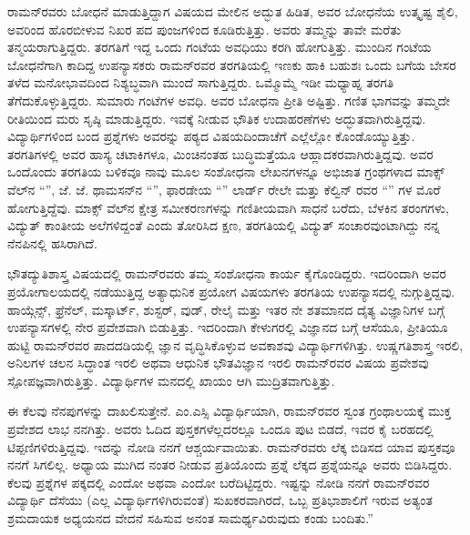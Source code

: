 ರಾಮನ್‍ರವರು ಬೋಧನೆ ಮಾಡುತ್ತಿದ್ದಾಗ ವಿಷಯದ ಮೇಲಿನ ಅದ್ಭುತ ಹಿಡಿತ, ಅವರ ಬೋಧನೆಯ ಉತ್ಕೃಷ್ಟ ಶೈಲಿ, ಅವರಿಂದ ಹೊರಬೀಳುವ ನಿಖರ ಪದ ಪುಂಜಗಳಿಂದ ಕೂಡಿರುತ್ತಿತ್ತು. ಅವರು ತಮ್ಮನ್ನು ತಾವೇ ಮರೆತು ತನ್ಮಯರಾಗುತ್ತಿದ್ದರು. ತರಗತಿಗೆ ಇದ್ದ ಒಂದು ಗಂಟೆಯ ಅವಧಿಯು ಕರಗಿ ಹೋಗುತ್ತಿತ್ತು. ಮುಂದಿನ ಗಂಟೆಯ ಬೋಧನೆಗಾಗಿ ಕಾದಿದ್ದ ಉಪನ್ಯಾಸಕರು ರಾಮನ್‍ರವರ ತರಗತಿಯಲ್ಲಿ ಇಣಕು ಹಾಕಿ ಬಹುಶಃ ಒಂದು ಬಗೆಯ ಬೇಸರ ತಳೆದ ಮನೋಭಾವದಿಂದ ನಿಶ್ಯಬ್ಧವಾಗಿ ಮುಂದೆ ಸಾಗುತ್ತಿದ್ದರು. ಒಮ್ಮೊಮ್ಮೆ ಇಡೀ ಮಧ್ಯಾಹ್ನ ತರಗತಿ ತೆಗೆದುಕೊಳ್ಳುತ್ತಿದ್ದರು. ಸುಮಾರು  ಗಂಟೆಗಳ ಅವಧಿ. ಅವರ ಬೋಧನಾ ಪ್ರೀತಿ ಅಷ್ಟಿತ್ತು. ಗಣಿತ ಭಾಗವನ್ನು ತಮ್ಮದೇ ರೀತಿಯಿಂದ ಮರು ಸೃಷ್ಠಿ ಮಾಡುತ್ತಿದ್ದರು. ಇವಕ್ಕೆ ನೀಡುವ ಭೌತಿಕ ಉದಾಹರಣೆಗಳು ಅದ್ಭುತವಾಗಿರುತ್ತಿದ್ದವು. ವಿದ್ಯಾರ್ಥಿಗಳಿಂದ ಬಂದ ಪ್ರಶ್ನೆಗಳು ಅವರನ್ನು ಪಠ್ಯದ ವಿಷಯದಿಂದಾಚೆಗೆ ಎಲ್ಲೆಲ್ಲೋ ಕೊಂಡೊಯ್ಯುತ್ತಿತ್ತು. ತರಗತಿಗಳಲ್ಲಿ ಅವರ ಹಾಸ್ಯ ಚಟಾಕಿಗಳೂ, ಮಿಂಚಿನಂತಹ ಬುದ್ಧಿಮತ್ತೆಯೂ ಆಹ್ಲಾದಕರವಾಗಿರುತ್ತಿದ್ದವು. ಅವರ ಒಂದೊಂದು ತರಗತಿಯ ಬಳಿಕವೂ ನಾವು ಮೂಲ ಸಂಶೋಧನಾ ಲೇಖನಗಳನ್ನೂ ಅಭಿಜಾತ ಗ್ರಂಥಗಳಾದ ಮಾಕ್ಸ್ ವೆಲ್‍ನ “”, ಜೆ. ಜೆ. ಥಾಮಸನ್‍ನ “”, ಫಾರಡೇಯ “” ಲಾರ್ಡ್ ರೇಲೇ ಮತ್ತು ಕೆಲ್ವಿನ್ ರವರ “” ಗಳ ಮೊರೆ ಹೋಗುತ್ತಿದ್ದೆವು. ಮಾಕ್ಸ್ ವೆಲ್‍ನ ಕ್ಷೇತ್ರ ಸಮೀಕರಣಗಳನ್ನು ಗಣಿತೀಯವಾಗಿ ಸಾಧನೆ ಬರೆದು, ಬೆಳಕಿನ ತರಂಗಗಳು, ವಿದ್ಯುತ್ ಕಾಂತೀಯ ಅಲೆಗಳಿದ್ದಂತೆ ಎಂದು ತೋರಿಸಿದ ಕ್ಷಣ, ತರಗತಿಯಲ್ಲಿ ವಿದ್ಯುತ್ ಸಂಚಾರವುಂಟಾಗಿದ್ದು ನನ್ನ ನೆನಪಿನಲ್ಲಿ ಹಸಿರಾಗಿದೆ.

ಭೌತದ್ಯುತಿಶಾಸ್ತ್ರ ವಿಷಯದಲ್ಲಿ ರಾಮನ್‍ರವರು ತಮ್ಮ ಸಂಶೋಧನಾ ಕಾರ್ಯ ಕೈಗೊಂಡಿದ್ದರು. ಇದರಿಂದಾಗಿ ಅವರ ಪ್ರಯೋಗಾಲಯದಲ್ಲಿ ನಡೆಯುತ್ತಿದ್ದ ಅತ್ಯಾಧುನಿಕ ಪ್ರಯೋಗ ವಿಷಯಗಳು ತರಗತಿಯ ಉಪನ್ಯಾಸದಲ್ಲಿ ನುಗ್ಗುತ್ತಿದ್ದವು. ಹಾಯ್ಗೆನ್ಸ್, ಫ್ರೆನೆಲ್, ಮಸ್ಕಾರ್ಟ್, ಶುಸ್ಟರ್, ವುಡ್, ರೇಲೈ ಮತ್ತು ಇತರ ನೇ ಶತಮಾನದ ದೈತ್ಯ ವಿಜ್ಞಾನಿಗಳ ಬಗ್ಗೆ ಉಪನ್ಯಾಸಗಳಲ್ಲಿ ನೇರ ಪ್ರವೇಶವಾಗಿ ಬಿಡುತ್ತಿತ್ತು. ಇದರಿಂದಾಗಿ ಕೇಳುಗರಲ್ಲಿ ವಿಜ್ಞಾನದ ಬಗ್ಗೆ ಆಸೆಯೂ, ಪ್ರೀತಿಯೂ ಹುಟ್ಟಿ ರಾಮನ್‍ರವರ ಪಾದದಡಿಯಲ್ಲಿ ಜ್ಞಾನ ವೃದ್ಧಿಸಿಕೊಳ್ಳುವ ಅವಕಾಶವು ವಿದ್ಯಾರ್ಥಿಗಳಿಗಿತ್ತು. ಉಷ್ಣಗತಿಶಾಸ್ತ್ರ ಇರಲಿ, ಅನಿಲಗಳ ಚಲನ ಸಿದ್ಧಾಂತ ಇರಲಿ ಅಥವಾ ಆಧುನಿಕ ಭೌತವಿಜ್ಞಾನ ಇರಲಿ ರಾಮನ್‍ರವರ ವಿಷಯ ಪ್ರವೇಶವು ಸ್ಪೋಪಜ್ಞವಾಗಿರುತ್ತಿತ್ತು. ವಿದ್ಯಾರ್ಥಿಗಳ ಮನದಲ್ಲಿ ಖಾಯಂ ಆಗಿ ಮುದ್ರಿತವಾಗುತ್ತಿತ್ತು.

ಈ ಕೆಲವು ನೆನಪುಗಳನ್ನು ದಾಖಲಿಸುತ್ತೇನೆ. ಎಂ.ಎಸ್ಸಿ ವಿದ್ಯಾರ್ಥಿಯಾಗಿ, ರಾಮನ್‍ರವರ ಸ್ವಂತ ಗ್ರಂಥಾಲಯಕ್ಕೆ ಮುಕ್ತ ಪ್ರವೇಶದ ಲಾಭ ನನಗಿತ್ತು. ಅವರು ಓದಿದ ಪುಸ್ತಕಗಳೆಲ್ಲದರಲ್ಲೂ ಒಂದೂ ಪುಟ ಬಿಡದೆ, ಇವರ ಕೈ ಬರಹದಲ್ಲಿ ಟಿಪ್ಪಣಿಗಳಿರುತ್ತಿದ್ದವು. ಇದನ್ನು ನೋಡಿ ನನಗೆ ಆಶ್ಚರ್ಯವಾಯಿತು. ರಾಮನ್‍ರವರು ಲೆಕ್ಕ ಬಿಡಿಸದ ಯಾವ ಪುಸ್ತಕವೂ ನನಗೆ ಸಿಗಲಿಲ್ಲ. ಅಧ್ಯಾಯ ಮುಗಿದ ನಂತರ ನೀಡುವ ಪ್ರತಿಯೊಂದು ಪ್ರಶ್ನೆ ಲೆಕ್ಕದ ಪ್ರಶ್ನೆಯನ್ನೂ ಅವರು ಬಿಡಿಸಿದ್ದರು. ಕೆಲವು ಪ್ರಶ್ನೆಗಳ ಪಕ್ಕದಲ್ಲಿ  ಎಂದೋ  ಅಥವಾ  ಎಂದೋ ಬರೆದಿಟ್ಟಿದ್ದರು. ಇಷ್ಟನ್ನು ನೋಡಿ ನನಗೆ ರಾಮನ್‍ರವರ ವಿದ್ಯಾರ್ಥಿ ದೆಸೆಯು (ಎಲ್ಲ ವಿದ್ಯಾರ್ಥಿಗಳಿಗಿರುವಂತೆ) ಸುಖಕರವಾಗಿರದೆ, ಒಬ್ಬ ಪ್ರತಿಭಾಶಾಲಿಗೆ ಇರುವ ಅತ್ಯಂತ ಶ್ರಮದಾಯಕ ಅಧ್ಯಯನದ ವೇದನೆ ಸಹಿಸುವ ಅನಂತ ಸಾಮರ್ಥ್ಯವಿರುವುದು ಕಂಡು ಬಂದಿತು.”

